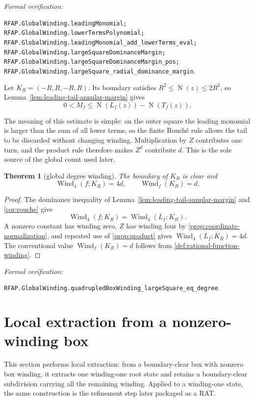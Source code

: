 \documentclass[11pt]{article}
\newtheorem{theorem}{Theorem}[section]
\newcommand{\Norm}[1]{\operatorname{N}\!\left(#1\right)}
\newcommand{\Wind}{\operatorname{Wind}}
\newcommand{\leanref}[1]{\par\smallskip\noindent
  \emph{Formal verification:}\par\nobreak
  {\raggedright\nolinkurl{#1}.\par}}
\begin{document}
\leanref{RFAP.GlobalWinding.leadingMonomial;
RFAP.GlobalWinding.lowerTermsPolynomial;
RFAP.GlobalWinding.leadingMonomial_add_lowerTerms_eval;
RFAP.GlobalWinding.largeSquareDominanceMargin;
RFAP.GlobalWinding.largeSquareDominanceMargin_pos;
RFAP.GlobalWinding.largeSquare_radial_dominance_margin}

Let $K_R=(-R,R,-R,R)$.  Its boundary satisfies
$R^2\le\Norm z\le2R^2$, so
Lemma~\ref{lem:leading-tail-annular-margin} gives
\[
       0<M_f\le\Norm{L_f(z)}-\Norm{T_f(z)}.
\]

The meaning of this estimate is simple: on the outer square the leading
monomial is larger than the sum of all lower terms, so the finite Rouché rule
allows the tail to be discarded without changing winding.  Multiplication by
$Z$ contributes one turn, and the product rule therefore makes $Z^d$
contribute $d$.  This is the sole source of the global count used later.

\begin{theorem}[global degree winding]
\label{thm:global-wind}
The boundary of $K_R$ is clear and
\[
             \Wind_4(f;K_R)=4d,\qquad \Wind_f(K_R)=d.
\]
\end{theorem}

\begin{proof}
The dominance inequality of Lemma~\ref{lem:leading-tail-annular-margin} and
\cref{cor:rouche} give
\[
                 \Wind_4(f;K_R)=\Wind_4(L_f;K_R).
\]
A nonzero constant has winding zero, $Z$ has winding four by
\cref{prop:coordinate-normalization}, and repeated use of
\cref{prop:product} gives $\Wind_4(L_f;K_R)=4d$.  The conventional value
$\Wind_f(K_R)=d$ follows from
\cref{def:rational-function-winding}.
\end{proof}

\leanref{RFAP.GlobalWinding.quadrupledBoxWinding_largeSquare_eq_degree}

\section{Local extraction from a nonzero-winding box}
\label{sec:local-extraction}

This section performs local extraction: from a boundary-clear box with
nonzero box winding, it extracts one winding-one root state and retains a
boundary-clear subdivision carrying all the remaining winding.  Applied to
a winding-one state, the same construction is the refinement step later
packaged as a RAT.
\end{document}
